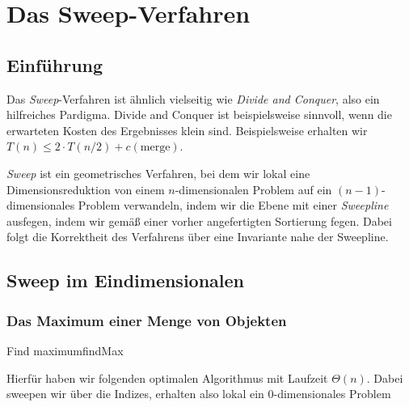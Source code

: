 \documentclass[language=ngerman,algolist,acrolist]{TemplateLecture}
\begin{document}
\setcounter{chapter}{1}


\chapter{Das Sweep-Verfahren}
\section{Einführung}


Das \emph{Sweep}-Verfahren ist ähnlich vielseitig wie \emph{Divide and Conquer}, also ein hilfreiches Pardigma. Divide and Conquer ist beispielsweise sinnvoll, wenn die erwarteten Kosten des Ergebnisses klein sind. Beispielsweise erhalten wir $T(n) \leq 2 \cdot T(n/2) + c(\text{merge})$. 

\emph{Sweep} ist ein geometrisches Verfahren, bei dem wir lokal eine Dimensionsreduktion von einem $n$-dimensionalen Problem auf ein $(n-1)$-dimensionales Problem verwandeln, indem wir die Ebene mit einer \emph{Sweepline} ausfegen, indem wir gemäß einer vorher angefertigten Sortierung fegen. Dabei folgt die Korrektheit des Verfahrens über eine Invariante nahe der Sweepline.

\section{Sweep im Eindimensionalen}
\subsection{Das Maximum einer Menge von Objekten}

\begin{prob}{Find maximum}{findMax}
\end{prob}

Hierfür haben wir folgenden optimalen Algorithmus mit Laufzeit $\Theta(n)$. Dabei sweepen wir über die Indizes, erhalten also lokal ein $0$-dimensionales Problem

\begin{algorithm}[h]
    \caption{\textsc{FindMax}}
    \begin{algorithmic}[1]
            \EndIf{}
        \EndFor{}
        \State{\Return{$\MaxSF$}}
    \end{algorithmic}
\end{algorithm}
\end{document}

